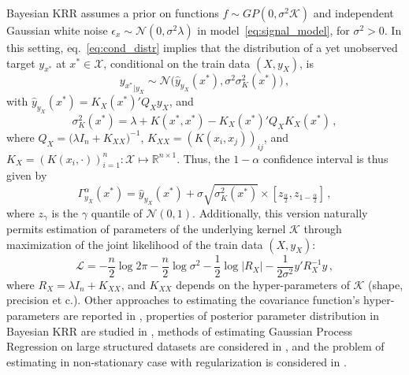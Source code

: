 \documentclass[conference]{IEEEtran}
\newcommand{\Ncal}{\mathcal{N}}
\newcommand{\Kcal}{\mathcal{K}}
\newcommand{\Xcal}{\mathcal{X}}
\newcommand{\Real}{\mathbb{R}}
\begin{document}
Bayesian KRR assumes a prior on functions $f\sim GP(0, \sigma^2 \Kcal)$ and independent
Gaussian white noise $\epsilon_x\sim \Ncal(0, \sigma^2 \lambda)$ in model~\ref{eq:signal_model},
for $\sigma^2 > 0$. In this setting, eq.~\ref{eq:cond_distr} implies that the distribution
of a yet unobserved target $y_{x^*}$ at $x^*\in \Xcal$, conditional on the train data $(X, y_X)$,
is
\begin{equation} \label{eq:gp_cond_dist}
{y_{x^*}}_{|y_X}
  \sim \Ncal\bigl(\hat{y}_{y_X}(x^*), \sigma^2 \sigma_K^2(x^*)\bigr) \,,
\end{equation}
with $\hat{y}_{y_X}(x^*) = K_X(x^*)' Q_X y_X$, and
\begin{equation*}
  \sigma_K^2(x^*)
    = \lambda + K(x^*, x^*) - K_X(x^*)' Q_X K_X(x^*) \,,
\end{equation*}
where $Q_X = \bigl(\lambda I_n + K_{XX}\bigr)^{-1}$, $K_{XX} = (K(x_i,x_j))_{ij}$,
and $K_X = (K(x_i, \cdot))_{i=1}^n: \Xcal \mapsto \Real^{n\times1}$. Thus, the $1 - \alpha$
confidence interval is thus given by
\begin{equation} \label{eq:gp_conf_int}
\Gamma^\alpha_{y_X}(x^*)
  = \hat{y}_{y_X}(x^*)
  + \sigma \sqrt{\sigma_K^2(x^*)}
  \times [z_{\frac{\alpha}{2}}, z_{1-\frac{\alpha}{2}}]
  \,,
\end{equation}
where $z_\gamma$ is the $\gamma$ quantile of $\Ncal(0, 1)$. Additionally, this version
naturally permits estimation of parameters of the underlying kernel $\Kcal$ through
maximization of the joint likelihood of the train data $(X, y_X)$:
\begin{equation} \label{eq:bkrr_likelihood}
  \mathcal{L}
    = -\frac{n}{2} \log 2\pi
    - \frac{n}{2}\log \sigma^2
    - \frac{1}{2}\log \lvert R_X \rvert
    - \frac{1}{2\sigma^2} y' R_X^{-1} y
    \,,
\end{equation}
where $R_X = \lambda I_n + K_{XX}$, and $K_{XX}$ depends on the hyper-parameters of
$\Kcal$ (shape, precision et c.).
Other approaches to estimating the covariance function's hyper-parameters are reported
in \cite{Burnaev2014}, properties of posterior parameter distribution in Bayesian KRR
are studied in \cite{Zaitsev2013}, methods of estimating Gaussian Process Regression
on large structured datasets are considered in \cite{Belyaev2015, Belyaev2016}, and
the problem of estimating in non-stationary case with regularization is considered in 
\cite{Burnaev2016}.

\end{document}
